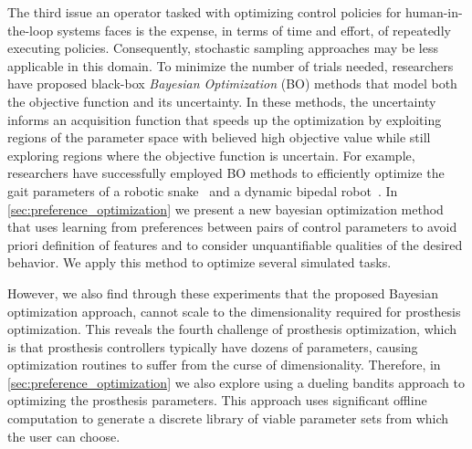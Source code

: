 The third issue an operator tasked with optimizing control policies for
human-in-the-loop systems faces is the expense, in terms of time and effort, of
repeatedly executing policies. Consequently, stochastic sampling approaches may
be less applicable in this domain. To minimize the number of trials needed,
researchers have proposed black-box \emph{Bayesian Optimization} (BO) methods
that model both the objective function and its uncertainty. In these methods,
the uncertainty informs an acquisition function that speeds up the optimization
by exploiting regions of the parameter space with believed high objective value
while still exploring regions where the objective function is uncertain. For
example, researchers have successfully employed BO methods to efficiently
optimize the gait parameters of a robotic snake~\citep{tesch2011using} and a
dynamic bipedal robot~\citep{calandra2014bayesian}. In
\cref{sec:preference_optimization} we present a new bayesian optimization method
that uses learning from preferences between pairs of control parameters to avoid
priori definition of features and to consider unquantifiable qualities of the
desired behavior. We apply this method to optimize several simulated tasks.

However, we also find through these experiments that the proposed Bayesian
optimization approach, cannot scale to the dimensionality required for
prosthesis optimization. This reveals the fourth challenge of prosthesis
optimization, which is that prosthesis controllers typically have dozens of
parameters, causing optimization routines to suffer from the curse of
dimensionality. Therefore, in \cref{sec:preference_optimization} we also explore
using a dueling bandits \citep{yue2012k} approach to optimizing the prosthesis
parameters. This approach uses significant offline computation to generate a
discrete library of viable parameter sets from which the user can choose.
